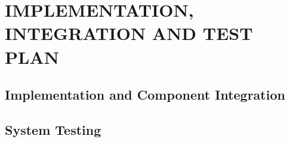 \chapter{IMPLEMENTATION, INTEGRATION AND TEST PLAN}
\label{ch:IIT}%
\section{Implementation and Component Integration}
\label{sec:componentIntegration}
\section{System Testing}
\label{sec:systemTesting}